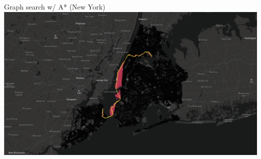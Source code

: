 \documentclass[aspectratio=169]{beamer}
\makeatletter
\newcommand{\white}[1]{{\color{pureminimalistic@text@white} #1}}
\makeatother
\begin{document}
\begin{frame}[plain]{Graph search w/ A* \white{(New York)}}
    \includegraphics[width=1.0\linewidth, keepaspectratio, trim={0.5cm 1.5cm 0 2.5cm}, clip]{figures/ny_graph_based_geodesic.png}
\end{frame}
\end{document}
